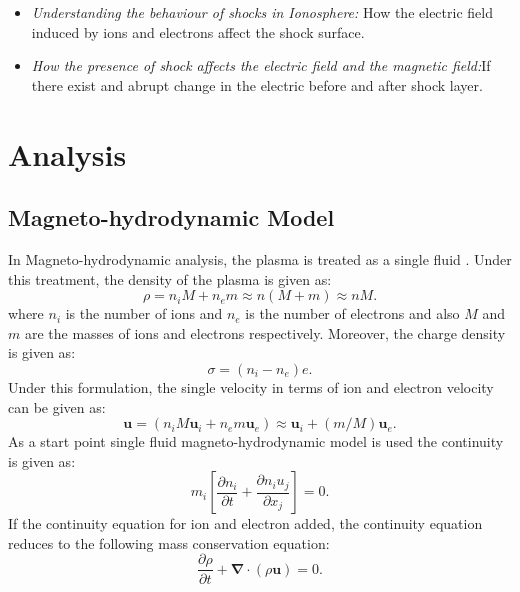 \documentclass[12pt]{report}
\begin{document}
\begin{itemize}
   \item {\small \emph{ \color{blue} Understanding the behaviour of shocks in Ionosphere:}}  How  the electric field induced by ions and electrons affect the shock surface.
   \item  {\small \emph{ \color{blue} How the presence of shock affects the electric field and the magnetic field:}}If there exist and abrupt change in the electric before and after shock layer.
   \end{itemize}
\chapter{Analysis}

\section{Magneto-hydrodynamic Model \label{MHD}}
In Magneto-hydrodynamic analysis, the plasma is treated as a single fluid \cite{IntPlasma}. Under this treatment, the density of the plasma is given as:
\begin{equation}
\label{eq:8}
\rho= n_i M +n_e m \approx n(M+m) \approx nM.
\end{equation}
where $n_i$ is the number of ions and $n_e$ is the number of electrons and also $M$ and $m$ are the masses of ions and electrons respectively. Moreover, the charge density is given as:
\begin{equation}
\label{eq:9}
\sigma = (n_i - n_e)e.
\end{equation}
Under this formulation, the single velocity in terms of ion and electron velocity can be given as:
\begin{equation}
\label{eq:10}
\mathbf{u}=(n_i M \mathbf{u}_i +  n_e m \mathbf{u}_e)\approx \mathbf{u}_i + (m/M)\mathbf{u}_e.
\end{equation}
As a start point single fluid magneto-hydrodynamic model\cite{IntPlasma} is used 
the continuity is given as:
\begin{equation}
\label{eq:12}
m_i\left [\frac{\partial n_i}{\partial t}+\frac{\partial n_i u_j  }{\partial x_j}\right ]=0. 
\end{equation}
If the continuity equation for ion and electron added, the continuity equation reduces to the following mass conservation equation:
\begin{equation}
\label{eq:13}
\frac{\partial \rho}{\partial t}+\mathbf{\nabla}\cdot \left ( \rho \mathbf{u} \right ) =0.
\end{equation}
\end{document}
